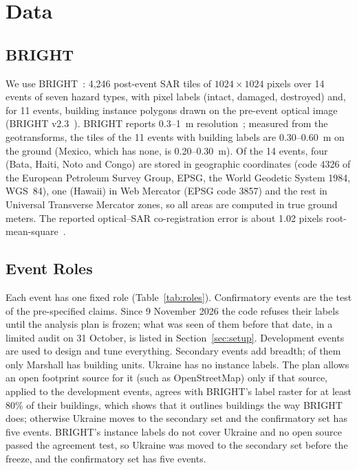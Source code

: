 \documentclass{ieeeaccess}
\begin{document}
\section{Data}
\label{sec:data}

\subsection{BRIGHT}
We use BRIGHT~\cite{chen2025bright}: 4,246 post-event SAR tiles of $1024\times1024$ pixels over 14 events of seven hazard types, with pixel labels (intact, damaged, destroyed) and, for 11 events, building instance polygons drawn on the pre-event optical image (BRIGHT v2.3~\cite{chen2026brightzenodo}). BRIGHT reports 0.3--1~m resolution~\cite{chen2025bright}; measured from the geotransforms, the tiles of the 11 events with building labels are 0.30--0.60~m on the ground (Mexico, which has none, is 0.20--0.30~m). Of the 14 events, four (Bata, Haiti, Noto and Congo) are stored in geographic coordinates (code 4326 of the European Petroleum Survey Group, EPSG, the World Geodetic System 1984, WGS~84), one (Hawaii) in Web Mercator (EPSG code 3857) and the rest in Universal Transverse Mercator zones, so all areas are computed in true ground meters. The reported optical--SAR co-registration error is about 1.02 pixels root-mean-square~\cite{chen2025bright}.

\subsection{Event Roles}
Each event has one fixed role (Table~\ref{tab:roles}). Confirmatory events are the test of the pre-specified claims. Since 9 November 2026 the code refuses their labels until the analysis plan is frozen; what was seen of them before that date, in a limited audit on 31 October, is listed in Section~\ref{sec:setup}. Development events are used to design and tune everything. Secondary events add breadth; of them only Marshall has building units. Ukraine has no instance labels. The plan allows an open footprint source for it (such as OpenStreetMap) only if that source, applied to the development events, agrees with BRIGHT's label raster for at least 80\% of their buildings, which shows that it outlines buildings the way BRIGHT does; otherwise Ukraine moves to the secondary set and the confirmatory set has five events. BRIGHT's instance labels do not cover Ukraine and no open source passed the agreement test, so Ukraine was moved to the secondary set before the freeze, and the confirmatory set has five events.
\end{document}
